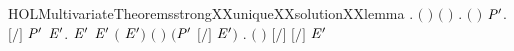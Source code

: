 \newcommand{\HOLMultivariateTheoremsSTRONGXXEQUIVXXsubstXXcontext}{\UseVerbatim{HOLMultivariateTheoremsSTRONGXXEQUIVXXsubstXXcontext}}
\begin{SaveVerbatim}{HOLMultivariateTheoremsstrongXXuniqueXXsolutionXXlemma}
\HOLTokenTurnstile{} \HOLSymConst{\HOLTokenForall{}} .
          \HOLSymConst{\HOLTokenConj{}}   \HOLConst{\HOLTokenSubset{}}   \HOLSymConst{\HOLTokenConj{}}
        \ensuremath{(} \ensuremath{)} \ensuremath{(} \ensuremath{)} \HOLSymConst{\HOLTokenImp{}}
       \HOLSymConst{\HOLTokenForall{}}.
           \ensuremath{(}  \HOLSymConst{\ensuremath{=}}  \ensuremath{)} \HOLSymConst{\HOLTokenImp{}}
           \HOLSymConst{\HOLTokenForall{}} \ensuremath{\HOLBoundVar{P}\sp{\prime}}.
               \ensuremath{[}\ensuremath{/}\ensuremath{]}  \HOLTokenTransBegin{}\HOLTokenTransEnd \ensuremath{\HOLBoundVar{P}\sp{\prime}} \HOLSymConst{\HOLTokenImp{}}
               \HOLSymConst{\HOLTokenExists{}}\ensuremath{\HOLBoundVar{E}\sp{\prime}}.
                     \ensuremath{\HOLBoundVar{E}\sp{\prime}} \HOLSymConst{\HOLTokenConj{}}  \ensuremath{\HOLBoundVar{E}\sp{\prime}} \HOLConst{\HOLTokenSubset{}}   \HOLSymConst{\HOLTokenConj{}}
                    \ensuremath{(} \ensuremath{\HOLBoundVar{E}\sp{\prime}}\ensuremath{)} \ensuremath{(} \ensuremath{)} \HOLSymConst{\HOLTokenConj{}}
                   \ensuremath{(}\ensuremath{\HOLBoundVar{P}\sp{\prime}} \HOLSymConst{\ensuremath{=}} \ensuremath{[}\ensuremath{/}\ensuremath{]} \ensuremath{\HOLBoundVar{E}\sp{\prime}}\ensuremath{)} \HOLSymConst{\HOLTokenConj{}}
                   \HOLSymConst{\HOLTokenForall{}}.
                       \ensuremath{(}  \HOLSymConst{\ensuremath{=}}  \ensuremath{)} \HOLSymConst{\HOLTokenImp{}}
                       \ensuremath{[}\ensuremath{/}\ensuremath{]}  \HOLTokenTransBegin{}\HOLTokenTransEnd \ensuremath{[}\ensuremath{/}\ensuremath{]} \ensuremath{\HOLBoundVar{E}\sp{\prime}}
\end{SaveVerbatim}
